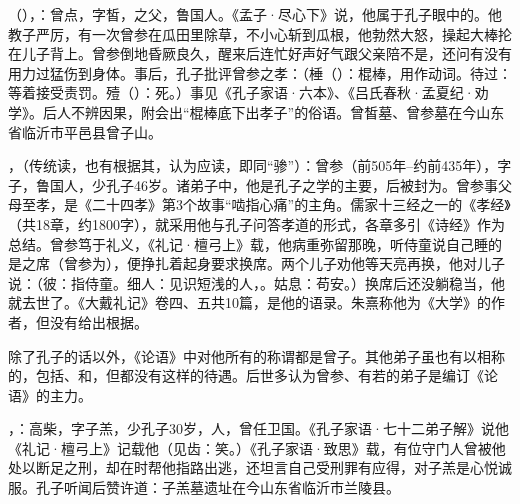 （），：曾点，字皙，之父，鲁国人。《孟子·尽心下》说，他属于孔子眼中的。他教子严厉，有一次曾参在瓜田里除草，不小心斩到瓜根，他勃然大怒，操起大棒抡在儿子背上。曾参倒地昏厥良久，醒来后连忙好声好气跟父亲陪不是，还问有没有用力过猛伤到身体。事后，孔子批评曾参之孝：（棰（）：棍棒，用作动词。待过：等着接受责罚。殪（）：死。）事见《孔子家语·六本》、《吕氏春秋·孟夏纪·劝学》。后人不辨因果，附会出“棍棒底下出孝子”的俗语。曾皙墓、曾参墓在今山东省临沂市平邑县曾子山。

，（传统读，也有根据其，认为应读，即同“骖”）：曾参（前505年--约前435年），字子，鲁国人，少孔子46岁。诸弟子中，他是孔子之学的主要，后被封为。曾参事父母至孝，是《二十四孝》第3个故事“啮指心痛”的主角。儒家十三经之一的《孝经》（共18章，约1800字），就采用他与孔子问答孝道的形式，各章多引《诗经》作为总结。曾参笃于礼义，《礼记·檀弓上》载，他病重弥留那晚，听侍童说自己睡的是之席（曾参为），便挣扎着起身要求换席。两个儿子劝他等天亮再换，他对儿子说：（彼：指侍童。细人：见识短浅的人，。姑息：苟安。）换席后还没躺稳当，他就去世了。《大戴礼记》卷四、五共10篇，是他的语录。朱熹称他为《大学》的作者，但没有给出根据。

除了孔子的话以外，《论语》中对他所有的称谓都是曾子。其他弟子虽也有以相称的，包括、和，但都没有这样的待遇。后世多认为曾参、有若的弟子是编订《论语》的主力。

，：高柴，字子羔，少孔子30岁，人，曾任卫国。《孔子家语·七十二弟子解》说他《礼记·檀弓上》记载他（见齿：笑。）《孔子家语·致思》载，有位守门人曾被他处以断足之刑，却在时帮他指路出逃，还坦言自己受刑罪有应得，对子羔是心悦诚服。孔子听闻后赞许道：子羔墓遗址在今山东省临沂市兰陵县。

